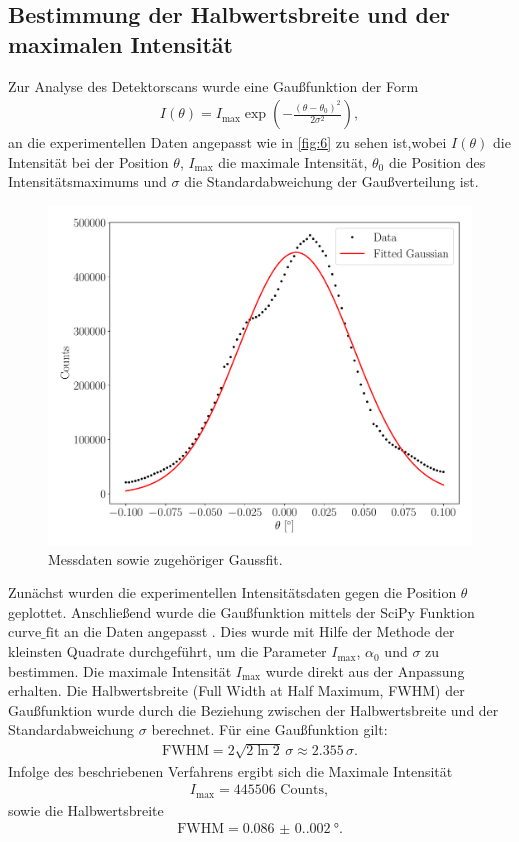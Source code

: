 \documentclass[12pt]{article}
\begin{document}
\subsection{Bestimmung der Halbwertsbreite und der maximalen Intensität}
Zur Analyse des Detektorscans wurde eine Gaußfunktion der Form
\begin{align*}
I(\theta) = I_{\text{max}} \exp \left( -\frac{(\theta - \theta_0)^2}{2\sigma^2} \right),
\end{align*}
an die experimentellen Daten angepasst wie in \autoref{fig:6} zu sehen ist,wobei $I(\theta)$ die Intensität bei der Position $\theta$, $I_{\text{max}}$ die maximale Intensität, \(\theta_0\) die Position des Intensitätsmaximums und \(\sigma\) die Standardabweichung der Gaußverteilung ist.
\begin{figure}[H]
  \centering
  \includegraphics[scale=0.5]{Ressourcen/detektor1.pdf}
  \caption{Messdaten sowie zugehöriger Gaussfit.}\label{fig:6}
\end{figure}
Zunächst wurden die experimentellen Intensitätsdaten gegen die Position \(\theta\) geplottet. Anschließend wurde die Gaußfunktion mittels der SciPy Funktion $\text{curve\_fit}$ an die Daten angepasst \cite{scipy}. Dies wurde mit Hilfe der Methode der kleinsten Quadrate durchgeführt, um die Parameter \(I_{\text{max}}\), \(\alpha_0\) und \(\sigma\) zu bestimmen. Die maximale Intensität \(I_{\text{max}}\) wurde direkt aus der Anpassung erhalten. Die Halbwertsbreite (Full Width at Half Maximum, FWHM) der Gaußfunktion wurde durch die Beziehung zwischen der Halbwertsbreite und der Standardabweichung \(\sigma\) berechnet. Für eine Gaußfunktion gilt:
\begin{align*}
\text{FWHM} = 2 \sqrt{2 \ln 2} \, \sigma \approx \num{2.355} \, \sigma.
\end{align*}
Infolge des beschriebenen Verfahrens ergibt sich die Maximale Intensität 
\begin{align*}
  I_{\text{max}} = 445506\text{ Counts},
\end{align*}
sowie die Halbwertsbreite
\begin{align*}
  \text{FWHM} = \SI{0.086(0.002)}{\degree}\text{.}
\end{align*}
\end{document}
